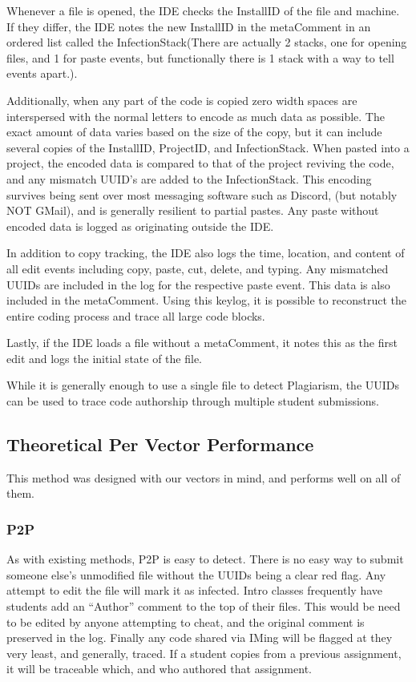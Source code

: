 \documentclass[conference]{IEEEtran}
\newcommand{\installID}{InstallID\xspace}
\newcommand{\projectID}{ProjectID\xspace}
\newcommand{\metaComment}{metaComment\xspace}
\newcommand{\infectionStack}{InfectionStack\xspace}
\begin{document}
Whenever a file is opened, the IDE checks the \installID of the file and machine.  If they differ, the IDE notes the new \installID in the \metaComment in an ordered list called the \infectionStack (There are actually 2 stacks, one for opening files, and 1 for paste events, but functionally there is 1 stack with a way to tell events apart.).  

Additionally, when any part of the code is copied zero width spaces are interspersed with the normal letters to encode as much data as possible.  The exact amount of data varies based on the size of the copy, but it can include several copies of the \installID, \projectID, and \infectionStack.  When pasted into a project, the encoded data is compared to that of the project reviving the code, and any mismatch UUID's are added to the \infectionStack. This encoding survives being sent over most messaging software such as Discord, (but notably NOT GMail), and is generally resilient to partial pastes.  Any paste without encoded data is logged as originating outside the IDE.

In addition to copy tracking, the IDE also logs the time, location, and content of all edit events including copy, paste, cut, delete, and typing.  Any mismatched UUIDs are included in the log for the respective paste event.  This data is also included in the \metaComment.  Using this keylog, it is possible to reconstruct the entire coding process and trace all large code blocks.

Lastly, if the IDE loads a file without a \metaComment, it notes this as the first edit and logs the initial state of the file.

While it is generally enough to use a single file to detect Plagiarism, the UUIDs can be used to trace code authorship through multiple student submissions.

\subsection*{\textbf{Theoretical Per Vector Performance}}
This method was designed with our vectors in mind, and performs well on all of them.
\subsubsection*{\textbf{P2P}}\hfill\break\indent
		As with existing methods, P2P is easy to detect.  There is no easy way to submit someone else's unmodified file without the UUIDs being a clear red flag.  Any attempt to edit the file will mark it as infected.  Intro classes frequently have students add an ``Author'' comment to the top of their files.  This would be need to be edited by anyone attempting to cheat, and the original comment is preserved in the log. Finally any code shared via IMing will be flagged at they very least, and generally, traced.   If a student copies from a previous assignment, it will be traceable which, and who authored that assignment.
		
\end{document}
